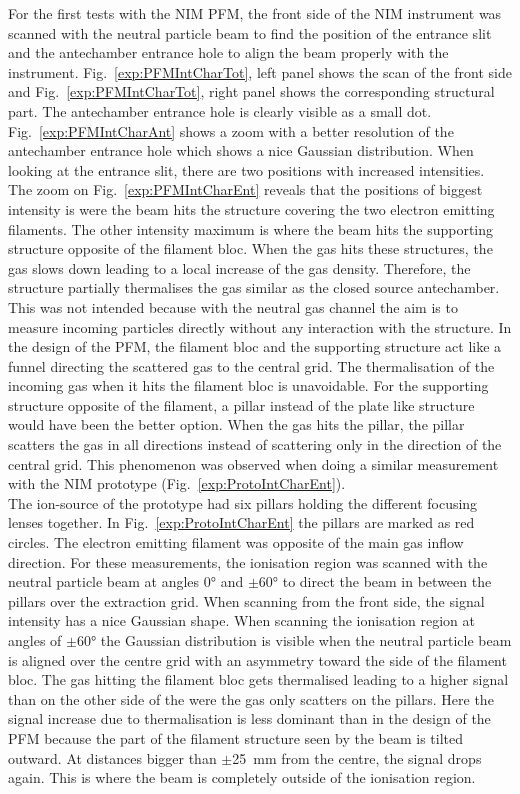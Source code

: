 	For the first tests with the NIM PFM, the front side of the NIM instrument was scanned with the neutral particle beam to find the position of the entrance slit and the antechamber entrance hole to align the beam properly with the instrument. Fig.~\ref{exp:PFMIntCharTot}, left panel shows the scan of the front side and Fig.~\ref{exp:PFMIntCharTot}, right panel shows the corresponding structural part. The antechamber entrance hole is clearly visible as a small dot. Fig.~\ref{exp:PFMIntCharAnt} shows a zoom with a better resolution of the antechamber entrance hole which shows a nice Gaussian distribution. When looking at the entrance slit, there are two positions with increased intensities. The zoom on Fig.~\ref{exp:PFMIntCharEnt} reveals that the positions of biggest intensity is were the beam hits the structure covering the two electron emitting filaments. The other intensity maximum is where the beam hits the supporting structure opposite of the filament bloc. When the gas hits these structures, the gas slows down leading to a local increase of the gas density. Therefore, the structure partially thermalises the gas similar as the closed source antechamber. This was not intended because with the neutral gas channel the aim is to measure incoming particles directly without any interaction with the structure. In the design of the PFM, the filament bloc and the supporting structure act like a funnel directing the scattered gas to the central grid. The thermalisation of the incoming gas when it hits the filament bloc is unavoidable. For the supporting structure opposite of the filament, a pillar instead of the plate like structure would have been the better option. When the gas hits the pillar, the pillar scatters the gas in all directions instead of scattering only in the direction of the central grid. This phenomenon was observed when doing a similar measurement with the NIM prototype (Fig.~\ref{exp:ProtoIntCharEnt}).\\
	The ion-source of the prototype had six pillars holding the different focusing lenses together. In Fig.~\ref{exp:ProtoIntCharEnt} the pillars are marked as red circles. The electron emitting filament was opposite of the main gas inflow direction. For these measurements, the ionisation region was scanned with the neutral particle beam at angles 0° and $\pm$60° to direct the beam in between the pillars over the extraction grid. When scanning from the front side, the signal intensity has a nice Gaussian shape. When scanning the ionisation region at angles of $\pm$60° the Gaussian distribution is visible when the neutral particle beam is aligned over the centre grid with an asymmetry toward the side of the filament bloc. The gas hitting the filament bloc gets thermalised leading to a higher signal than on the other side of the were the gas only scatters on the pillars. Here the signal increase due to thermalisation is less dominant than in the design of the PFM because the part of the filament structure seen by the beam is tilted outward. At distances bigger than $\pm$25~mm from the centre, the signal drops again. This is where the beam is completely outside of the ionisation region.
